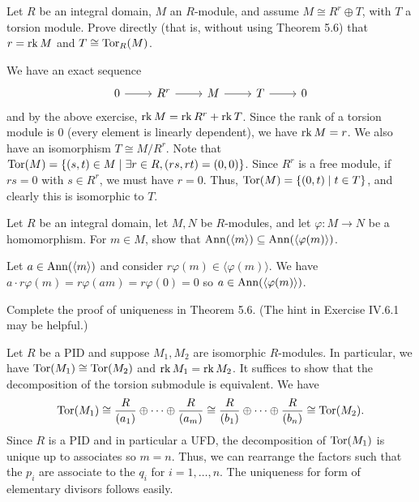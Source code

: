 \documentclass[../../master.tex]{subfiles}
\begin{document}
\begin{problem}
    Let $R$ be an integral domain, $M$ an $R$-module, and assume $M \cong R^{r} \oplus T$, with $T$ a torsion module.
    Prove directly (that is, without using Theorem 5.6) that $r = \operatorname{rk} M$ and $T \cong \operatorname{Tor}_R(M)$.
\end{problem}

\begin{solution}
    We have an exact sequence
    \[
    \begin{tikzcd}
        0 & R^{r} & M & T & 0
        \arrow[from=1-1, to=1-2] 
        \arrow[from=1-2, to=1-3] 
        \arrow[from=1-3, to=1-4] 
        \arrow[from=1-4, to=1-5] 
    \end{tikzcd}
    \]
    and by the above exercise, $\operatorname{rk} M = \operatorname{rk} R^{r} + \operatorname{rk} T$.
    Since the rank of a torsion module is 0 (every element is linearly dependent), we have $\operatorname{rk} M = r$.
    We also have an isomorphism $T \cong M / R^{r}$.
    Note that $\operatorname{Tor}(M) = \{(s, t) \in M \mid \exists r \in R, (rs, rt) = (0, 0)\}$.
    Since $R^{r}$ is a free module, if $rs = 0$ with $s \in R^{r}$, we must have $r = 0$.
    Thus, $\operatorname{Tor}(M) = \{(0, t) \mid t \in T\}$, and clearly this is isomorphic to $T$.
\end{solution}

\begin{problem}
    Let $R$ be an integral domain, let $M, N$ be $R$-modules, and let $\varphi : M \to N$ be a homomorphism.
    For $m \in M$, show that $\operatorname{Ann}(\langle m \rangle) \subseteq \operatorname{Ann}(\langle \varphi(m) \rangle)$.
\end{problem}

\begin{solution}
    Let $a \in \operatorname{Ann}(\langle m \rangle)$ and consider $r\varphi(m) \in \langle \varphi(m) \rangle$.
    We have $a \cdot r \varphi(m) = r \varphi(am) = r \varphi(0) = 0$ so $a \in \operatorname{Ann}(\langle \varphi(m) \rangle)$.
\end{solution}

\begin{problem}
    Complete the proof of uniqueness in Theorem 5.6.
    (The hint in Exercise IV.6.1 may be helpful.)
\end{problem}

\begin{solution}
    Let $R$ be a PID and suppose $M_1, M_2$ are isomorphic $R$-modules.
    In particular, we have $\operatorname{Tor}(M_1) \cong \operatorname{Tor}(M_2)$ and $\operatorname{rk} M_1 = \operatorname{rk} M_2$.
    It suffices to show that the decomposition of the torsion submodule is equivalent.
    We have
    \[
        \operatorname{Tor}(M_1) \cong \frac{R}{(a_1)} \oplus \cdots \oplus \frac{R}{(a_m)} \cong \frac{R}{(b_1)} \oplus \cdots \oplus \frac{R}{(b_n)} \cong \operatorname{Tor}(M_2).
    \]
    Since $R$ is a PID and in particular a UFD, the decomposition of $\operatorname{Tor}(M_1)$ is unique up to associates so $m = n$.
    Thus, we can rearrange the factors such that the $p_i$ are associate to the $q_i$ for $i = 1, \ldots, n$.
    The uniqueness for form of elementary divisors follows easily.
\end{solution}
\end{document}
